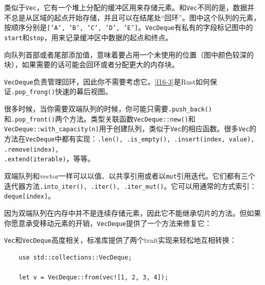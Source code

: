 类似于\texttt{Vec}，它有一个堆上分配的缓冲区用来存储元素。和\texttt{Vec}不同的是，数据并不总是从区域的起点开始存储，并且可以在结尾处“回环”。图中这个队列的元素，按顺序分别是\texttt{['A', 'B', 'C', 'D', 'E']}。\texttt{VecDeque}有私有的字段标记图中的\texttt{start}和\texttt{stop}，用来记录缓冲区中数据的起点和终点。

向队列首部或者尾部添加值，意味着要占用一个未使用的位置（图中颜色较深的块），如果需要的话可能会回环或者分配更大的内存块。

\texttt{VecDeque}负责管理回环，因此你不需要考虑它。\autoref{f16-3}是Rust如何保证\texttt{.pop\_frong()}快速的幕后视图。

很多时候，当你需要双端队列的时候，你可能只需要\texttt{.push\_back()}和\texttt{.pop\_front()}两个方法。类型关联函数\texttt{VecDeque::new()}和\texttt{VecDeque::with\_capacity(n)}用于创建队列，类似于\texttt{Vec}的相应函数。很多\texttt{Vec}的方法在\texttt{VecDeque}中都有实现：\texttt{.len(), .is\_empty(), .insert(index, value), .remove(index), \\
.extend(iterable)}，等等。

双端队列和vector一样可以以值、以共享引用或者以\texttt{mut}引用迭代。它们都有三个迭代器方法\texttt{.into\_iter(), .iter(), .iter\_mut()}。它可以用通常的方式索引：\texttt{deque[index]}。

因为双端队列在内存中并不是连续存储元素，因此它不能继承切片的方法。但如果你愿意承受移动元素的开销，\texttt{VecDeque}提供了一个方法来修复它：


\texttt{Vec}和\texttt{VecDeque}高度相关，标准库提供了两个trait实现来轻松地互相转换：



\begin{verbatim}
    use std::collections::VecDeque;

    let v = VecDeque::from(vec![1, 2, 3, 4]);
\end{verbatim}

